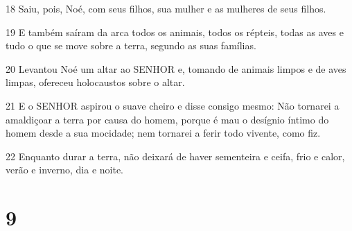 \par 18 Saiu, pois, Noé, com seus filhos, sua mulher e as mulheres de seus filhos.
\par 19 E também saíram da arca todos os animais, todos os répteis, todas as aves e tudo o que se move sobre a terra, segundo as suas famílias.
\par 20 Levantou Noé um altar ao SENHOR e, tomando de animais limpos e de aves limpas, ofereceu holocaustos sobre o altar.
\par 21 E o SENHOR aspirou o suave cheiro e disse consigo mesmo: Não tornarei a amaldiçoar a terra por causa do homem, porque é mau o desígnio íntimo do homem desde a sua mocidade; nem tornarei a ferir todo vivente, como fiz.
\par 22 Enquanto durar a terra, não deixará de haver sementeira e ceifa, frio e calor, verão e inverno, dia e noite.

\chapter{9}

